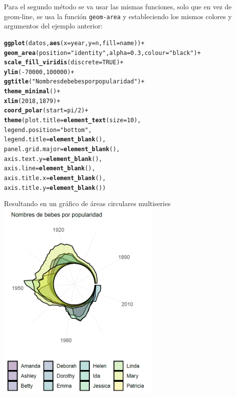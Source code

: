 \documentclass{article}\usepackage[]{graphicx}\usepackage[]{color}
\makeatletter
\newcommand{\hlnum}[1]{\textcolor[rgb]{0.686,0.059,0.569}{#1}}%
\newcommand{\hlstr}[1]{\textcolor[rgb]{0.192,0.494,0.8}{#1}}%
\newcommand{\hlopt}[1]{\textcolor[rgb]{0,0,0}{#1}}%
\newcommand{\hlstd}[1]{\textcolor[rgb]{0.345,0.345,0.345}{#1}}%
\newcommand{\hlkwc}[1]{\textcolor[rgb]{0.333,0.667,0.333}{#1}}%
\newcommand{\hlkwd}[1]{\textcolor[rgb]{0.737,0.353,0.396}{\textbf{#1}}}%
\newenvironment{kframe}{%
 \def\at@end@of@kframe{}%
 \ifinner\ifhmode%
  \def\at@end@of@kframe{\end{minipage}}%
  \begin{minipage}{\columnwidth}%
 \fi\fi%
 \def\FrameCommand##1{\hskip\@totalleftmargin \hskip-\fboxsep
 \colorbox{shadecolor}{##1}\hskip-\fboxsep
     \hskip-\linewidth \hskip-\@totalleftmargin \hskip\columnwidth}%
 \MakeFramed {\advance\hsize-\width
   \@totalleftmargin\z@ \linewidth\hsize
   \@setminipage}}%
 {\par\unskip\endMakeFramed%
 \at@end@of@kframe}
\newenvironment{knitrout}{}{} %
\makeatother
\begin{document}
\clearpage
Para el segundo m\'etodo se va usar las mismas funciones, solo que en vez de geom-line, se usa la funci\'on \texttt{geom-area} y estableciendo los mismos colores y argumentos del ejemplo anterior:
\begin{knitrout}
\color{fgcolor}\begin{kframe}
\begin{alltt}
\hlkwd{ggplot}\hlstd{(datos,} \hlkwd{aes}\hlstd{(}\hlkwc{x}\hlstd{=year,} \hlkwc{y}\hlstd{=n,} \hlkwc{fill} \hlstd{= name))} \hlopt{+}
  \hlkwd{geom_area}\hlstd{(}\hlkwc{position} \hlstd{=} \hlstr{"identity"}\hlstd{,}\hlkwc{alpha}\hlstd{=}\hlnum{0.3}\hlstd{,} \hlkwc{colour}\hlstd{=} \hlstr{"black"}\hlstd{)} \hlopt{+}
  \hlkwd{scale_fill_viridis}\hlstd{(}\hlkwc{discrete} \hlstd{=} \hlnum{TRUE}\hlstd{)} \hlopt{+}
  \hlkwd{ylim}\hlstd{(}\hlopt{-}\hlnum{70000}\hlstd{,}\hlnum{100000}\hlstd{)} \hlopt{+}
  \hlkwd{ggtitle}\hlstd{(}\hlstr{"Nombres de bebes por popularidad"}\hlstd{)} \hlopt{+}
  \hlkwd{theme_minimal}\hlstd{()} \hlopt{+}
  \hlkwd{xlim}\hlstd{(}\hlnum{2018}\hlstd{,} \hlnum{1879}\hlstd{)} \hlopt{+}
  \hlkwd{coord_polar}\hlstd{(}\hlkwc{start} \hlstd{= pi}\hlopt{/}\hlnum{2}\hlstd{)} \hlopt{+}
  \hlkwd{theme}\hlstd{(}\hlkwc{plot.title} \hlstd{=} \hlkwd{element_text}\hlstd{(}\hlkwc{size}\hlstd{=}\hlnum{10}\hlstd{),}
        \hlkwc{legend.position} \hlstd{=} \hlstr{"bottom"}\hlstd{,}
        \hlkwc{legend.title} \hlstd{=} \hlkwd{element_blank}\hlstd{(),}
        \hlkwc{panel.grid.major} \hlstd{=} \hlkwd{element_blank}\hlstd{(),}
        \hlkwc{axis.text.y} \hlstd{=} \hlkwd{element_blank}\hlstd{(),}
        \hlkwc{axis.line} \hlstd{=} \hlkwd{element_blank}\hlstd{(),}
        \hlkwc{axis.title.x} \hlstd{=} \hlkwd{element_blank}\hlstd{(),}
        \hlkwc{axis.title.y} \hlstd{=} \hlkwd{element_blank}\hlstd{())}
\end{alltt}
\end{kframe}
\end{knitrout}
Resultando en un gr\'afico de \'areas circulares multiseries~\\
\vbox{
    \centering
    \includegraphics[width=0.6\textwidth]{imag/area}
}
\end{document}
